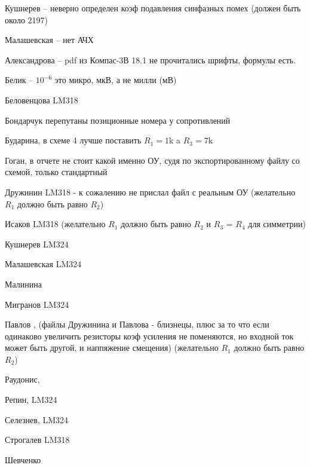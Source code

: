 \documentclass[a4paper,11pt]{article}
\begin{document}
\newpage
Кушнерев -- неверно определен коэф подавления синфазных помех (должен быть около 2197)

Малашевская -- нет АЧХ

\newpage

Александрова -- pdf из Компас-3В 18.1 не прочитались шрифты, формулы есть.

Белик        -- $10^{-6}$ это микро, мкВ, а не милли (мВ)

Беловенцова     LM318

Бондарчук  перепутаны позиционные номера у сопротивлений

Бударина, в схеме 4 лучше поставить $R_1=1$k a $R_3=7$k

Гоган, в отчете не стоит какой именно ОУ, судя по экспортированному файлу со схемой, только стандартный

Дружинин  LM318 - к сожалению не прислал файл с реальным ОУ (желательно $R_1$ должно быть равно $R_2$)

Исаков  LM318 (желательно $R_1$ должно быть равно $R_2$ и $R_3$ = $R_4$  для симметрии)

Кушнерев LM324

Малашевская LM324

Малинина

Мигранов LM324

Павлов , (файлы Дружинина и Павлова - близнецы, плюс за то что если одинаково увеличить резисторы коэф усиления не поменяются, но входной ток может быть другой, и наппяжение смещения)
(желательно $R_1$ должно быть равно $R_2$)

Раудонис, 

Репин, LM324

Селезнев, LM324

Строгалев LM318

Шевченко
\end{document}
